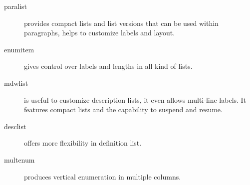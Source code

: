 \documentclass{article}
\begin{document}
\begin{description}
  \item[paralist] provides compact lists and list
    versions that can be used within paragraphs,
    helps to customize labels and layout.
  \item[enumitem] gives control over labels
    and lengths in all kind of lists.
  \item[mdwlist] is useful to customize description
    lists, it even allows multi-line labels.
    It features compact lists and the capability
    to suspend and resume.
  \item[desclist] offers more flexibility in
    definition list.
  \item[multenum] produces vertical enumeration in
    multiple columns.
\end{description}
\end{document}
